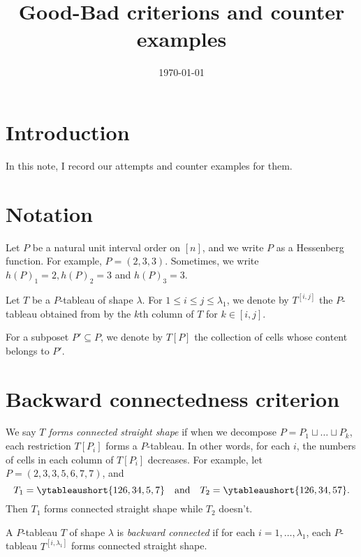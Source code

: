 \documentclass[12pt,a4paper,reqno]{amsart}
\title{Good-Bad criterions and counter examples}
\date{\today}
\theoremstyle{definition}
\theoremstyle{remark}
\newcommand\qand{\quad\mbox{and}\quad}
\begin{document}
\maketitle

\section{Introduction}
In this note, I record our attempts and counter examples for them.

\section*{Notation}
Let \( P \) be a natural unit interval order on \( [n] \), and we write \( P \) as a Hessenberg
function. For example, \( P=(2,3,3) \). Sometimes, we write \( h(P)_1 = 2, h(P)_2 = 3 \) and
\( h(P)_3 = 3 \).

Let \( T \) be a \( P \)-tableau of shape \( \lambda \).
For \( 1\le i\le j\le \lambda_1 \), we denote by \( T^{[i,j]} \) the \( P \)-tableau
obtained from by the \( k \)th column of \( T \) for \( k\in[i,j] \).

For a subposet \( P'\subseteq P \), we denote by \( T[P] \) the collection of cells
whose content belongs to \( P' \).

\section{Backward connectedness criterion}
We say \emph{\( T \) forms connected straight shape} if when we decompose \( P=P_1 \sqcup \dots \sqcup P_k \), each restriction \( T[P_i] \) forms a \( P \)-tableau. In other words, for each
\( i \), the numbers of cells in each column of \( T[P_i] \) decreases.
For example, let \( P=(2,3,3,5,6,7,7) \), and
\[
  T_1 = \ytableaushort{126,34,5,7} \qand T_2 = \ytableaushort{126,34,57}.
\]
Then \( T_1 \) forms connected straight shape while \( T_2 \) doesn't.

A \( P \)-tableau \( T \) of shape \( \lambda \) is \emph{backward connected}
if for each \( i=1,\dots,\lambda_1 \), each \( P \)-tableau \( T^{[i,\lambda_1]} \) forms
connected straight shape.
\end{document}

